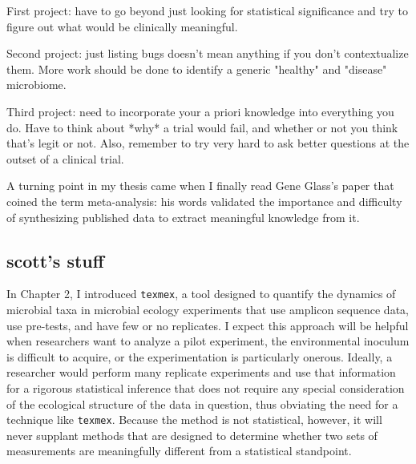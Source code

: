 First project: have to go beyond just looking for statistical significance and try to figure out what would be clinically meaningful.

Second project: just listing bugs doesn't mean anything if you don't contextualize them. More work should be done to identify a generic "healthy" and "disease" microbiome.

Third project: need to incorporate your a priori knowledge into everything you do. Have to think about *why* a trial would fail, and whether or not you think that's legit or not. Also, remember to try very hard to ask better questions at the outset of a clinical trial.

A turning point in my thesis came when I finally read Gene Glass's paper that coined the term meta-analysis: his words validated the importance and difficulty of synthesizing published data to extract meaningful knowledge from it.


\subsection{scott's stuff}

In Chapter 2, I introduced \texttt{texmex}, a tool designed to quantify the dynamics of
microbial taxa in microbial ecology experiments that use amplicon sequence
data, use pre-tests, and have few or no replicates. I expect this approach
will be helpful when researchers want to analyze a pilot experiment, the
environmental inoculum is difficult to acquire, or the experimentation is
particularly onerous. Ideally, a researcher would perform many replicate
experiments and use that information for a rigorous statistical inference that
does not require any special consideration of the ecological structure of the
data in question, thus obviating the need for a technique like \texttt{texmex}.
Because the method is not statistical, however, it will never supplant
methods that are designed to determine whether two sets of measurements are
meaningfully different from a statistical standpoint.

